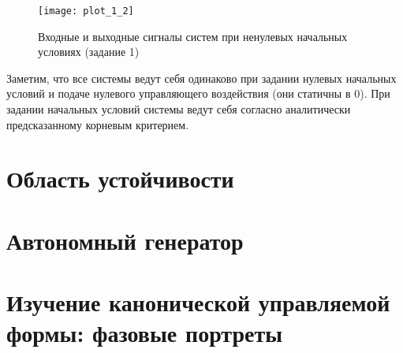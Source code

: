  \begin{figure}[h]
    \centering
    \texttt{[image: plot\_1\_2]}
    \caption{\label{fig:The-caption-1}Входные и выходные сигналы систем при ненулевых начальных условиях (задание 1)}
\end{figure}

Заметим, что все системы ведут себя одинаково при задании нулевых начальных условий 
и подаче нулевого управляющего воздействия (они статичны в 0). При задании начальных условий системы
ведут себя согласно аналитически предсказанному корневым критерием.

\pagebreak

\section{Область устойчивости}

\pagebreak

\section{Автономный генератор}

\pagebreak

\section{Изучение канонической управляемой формы: фазовые портреты}

\pagebreak